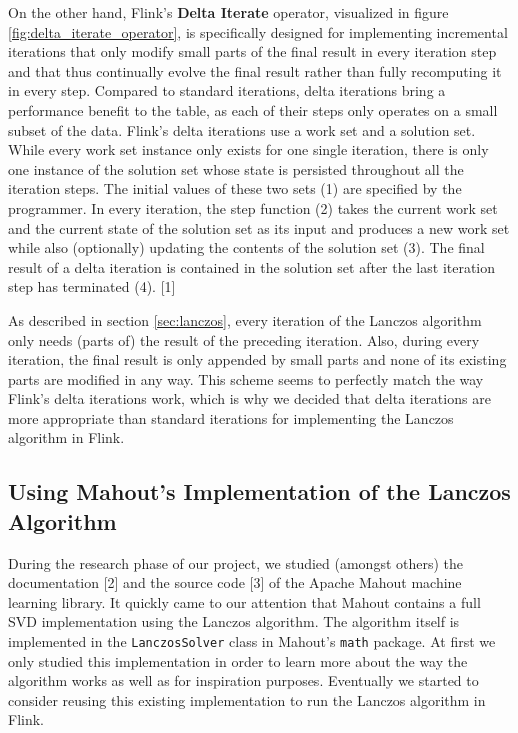 On the other hand, Flink's \textbf{Delta Iterate} operator, visualized in figure 
\ref{fig:delta_iterate_operator}, is specifically designed for implementing incremental
iterations that only modify small parts of the final result in every iteration step and that 
thus continually evolve the final result rather than fully recomputing it in every step.
Compared to standard iterations, delta iterations bring a performance benefit to the table,
as each of their steps only operates on a small subset of the data. Flink's delta iterations
use a work set and a solution set. While every work set instance only exists for one single
iteration, there is only one instance of the solution set whose state is persisted throughout 
all the iteration steps. The initial values of these two sets (1) are specified by the 
programmer. In every iteration, the step function (2) takes the current work set and the current
state of the solution set as its input and produces a new work set while also (optionally)
updating the contents of the solution set (3). The final result of a delta iteration is
contained in the solution set after the last iteration step has terminated (4). [1]


As described in section \ref{sec:lanczos}, every iteration of the Lanczos algorithm only needs
(parts of) the result of the preceding iteration. Also, during every iteration, the final result
is only appended by small parts and none of its existing parts are modified in any way. This
scheme seems to perfectly match the way Flink's delta iterations work, which is why we decided
that delta iterations are more appropriate than standard iterations for implementing the Lanczos
algorithm in Flink.



\subsection{Using Mahout's Implementation of the Lanczos Algorithm}

During the research phase of our project, we studied (amongst others) the documentation [2]
and the source code [3] of the Apache Mahout machine learning library. It quickly came to our
attention that Mahout contains a full SVD implementation using the Lanczos algorithm. The
algorithm itself is implemented in the \texttt{LanczosSolver} class in Mahout's \texttt{math}
package. At first we only studied this implementation in order to learn more about the way the
algorithm works as well as for inspiration purposes. Eventually we started to consider reusing
this existing implementation to run the Lanczos algorithm in Flink.

